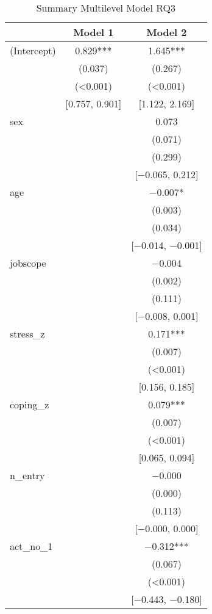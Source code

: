 \documentclass[
]{article}
\begin{document}
\begin{table}[H]
\centering\centering
\caption{\label{tab:rq3 results table}Summary Multilevel Model RQ3}
\centering
\begin{tabular}[t]{lcc}
\toprule
  & Model 1 & Model 2\\
\midrule
(Intercept) & \num{0.829}*** & \num{1.645}***\\
 & (\num{0.037}) & (\num{0.267})\\
 & (\num{<0.001}) & (\num{<0.001})\\
 & {}[\num{0.757}, \num{0.901}] & {}[\num{1.122}, \num{2.169}]\\
sex &  & \num{0.073}\\
 &  & \vphantom{2} (\num{0.071})\\
 &  & (\num{0.299})\\
 &  & {}[\num{-0.065}, \num{0.212}]\\
age &  & \num{-0.007}*\\
 &  & \vphantom{1} (\num{0.003})\\
 &  & (\num{0.034})\\
 &  & {}[\num{-0.014}, \num{-0.001}]\\
jobscope &  & \num{-0.004}\\
 &  & \vphantom{1} (\num{0.002})\\
 &  & (\num{0.111})\\
 &  & {}[\num{-0.008}, \num{0.001}]\\
stress\_z &  & \num{0.171}***\\
 &  & \vphantom{1} (\num{0.007})\\
 &  & \vphantom{18} (\num{<0.001})\\
 &  & {}[\num{0.156}, \num{0.185}]\\
coping\_z &  & \num{0.079}***\\
 &  & (\num{0.007})\\
 &  & \vphantom{17} (\num{<0.001})\\
 &  & {}[\num{0.065}, \num{0.094}]\\
n\_entry &  & \num{-0.000}\\
 &  & (\num{0.000})\\
 &  & (\num{0.113})\\
 &  & {}[\num{-0.000}, \num{0.000}]\\
act\_no\_1 &  & \num{-0.312}***\\
 &  & \vphantom{1} (\num{0.067})\\
 &  & \vphantom{16} (\num{<0.001})\\
 &  & {}[\num{-0.443}, \num{-0.180}]\\

\end{tabular}
\end{table}
\end{document}
